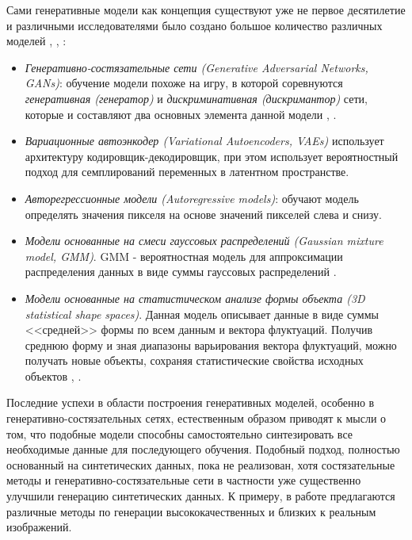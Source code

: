 Сами генеративные модели как концепция существуют уже не первое десятилетие и различными исследователями было создано большое количество различных моделей \cite{sanchez-at-glance}, \cite{lrgm-cloud}, :

\begin{itemize}

\item \textit{Генеративно-состязательные сети (Generative Adversarial Networks, GANs)}: обучение модели похоже на игру, в которой соревнуются \textit{генеративная (генератор)} и \textit{дискриминативная (дискримантор)} сети, которые и составляют два основных элемента данной модели \cite{gan-1}, \cite{gan-super}.

\item \textit{Вариационные автоэнкодер (Variational Autoencoders, VAEs)} использует архитектуру кодировщик-декодировщик, при этом использует вероятностный подход для семплирований переменных в латентном пространстве.


\item \textit{Авторегрессионные модели (Autoregressive models)}: обучают модель определять значения пикселя на основе значений пикселей слева и снизу.

\item \textit{Модели основанные на смеси гауссовых распределений (Gaussian mixture model, GMM)}. GMM - вероятностная модель для аппроксимации распределения данных в виде суммы гауссовых распределений \cite{bishop}.

\item \textit{Модели основанные на статистическом анализе формы объекта (3D statistical shape spaces)}. Данная модель описывает данные в виде суммы <<средней>> формы по всем данным и вектора флуктуаций. Получив среднюю форму и зная диапазоны варьирования вектора флуктуаций, можно получать новые объекты, сохраняя статистические свойства исходных объектов \cite{stat-shape-1}, \cite{stat-shape-2}.

\end{itemize}

Последние успехи в области построения генеративных моделей, особенно в генеративно-состязательных сетях, естественным образом приводят к мысли о том, что подобные модели способны самостоятельно синтезировать все необходимые данные для последующего обучения. Подобный подход, полностью основанный на синтетических данных, пока не реализован, хотя состязательные методы и генеративно-состязательные сети в частности уже существенно улучшили генерацию синтетических данных. К примеру, в работе \cite{Shrivastava-gap-real} предлагаются различные методы по генерации высококачественных и близких к реальным изображений.

